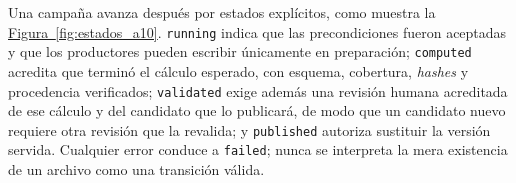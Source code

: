 \documentclass[12pt,letterpaper]{report}
\begin{document}
Una campaña avanza después por estados explícitos, como muestra la \hyperref[fig:estados_a10]{Figura~\ref*{fig:estados_a10}}.
\texttt{running} indica que las precondiciones fueron aceptadas y que los productores pueden
escribir únicamente en preparación; \texttt{computed} acredita que terminó el cálculo esperado, con
esquema, cobertura, \textit{hashes} y procedencia verificados; \texttt{validated} exige además una
revisión humana acreditada de ese cálculo y del candidato que lo publicará, de modo que un
candidato nuevo requiere otra revisión que la revalida; y \texttt{published} autoriza sustituir la
versión servida. Cualquier error conduce a \texttt{failed}; nunca se interpreta la mera existencia
de un archivo como una transición válida.

\begin{figure}[htbp]
\centering
\end{figure}
\end{document}
